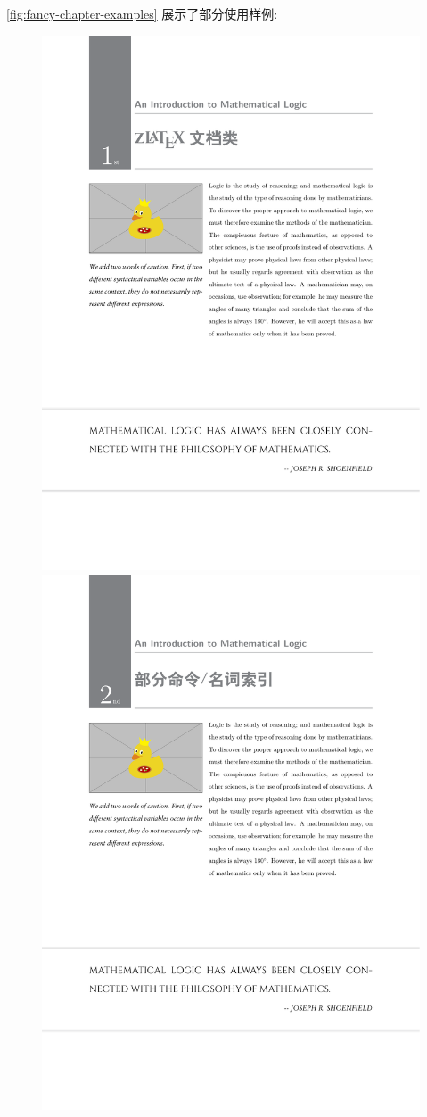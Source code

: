 \cref{fig:fancy-chapter-examples} 展示了部分使用样例:
\begin{figure}[!htb]
  \centering
  \includegraphics[width=.45\linewidth]{./pics/fancy_chapter_1.pdf}
  \includegraphics[width=.45\linewidth]{./pics/fancy_chapter_2.pdf}
  

\end{figure}

